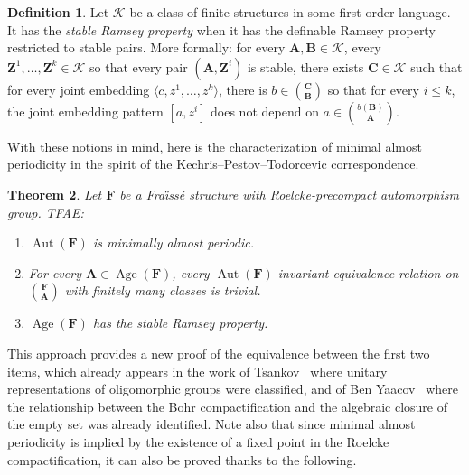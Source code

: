 \documentclass[11pt]{article}
\newtheorem{theo}{Theorem}[section]
\theoremstyle{definition}
\newtheorem{defi}[theo]{Definition}
\numberwithin{equation}{section}
\numberwithin{figure}{section}
\numberwithin{table}{section}
\newcommand{\K}{\mathcal{K}}
\newcommand*{\mA}{\mathbf{A}}
\newcommand*{\mB}{\mathbf{B}}
\newcommand*{\mC}{\mathbf{C}}
\newcommand*{\mF}{\mathbf{F}}
\newcommand*{\mZ}{\mathbf{Z}}
\DeclareMathOperator{\Aut}{Aut}
\DeclareMathOperator{\Age}{Age}
\begin{document}
\begin{defi}
Let $\K$ be a class of finite structures in some first-order language. It has the \emph{stable Ramsey property} when it has the definable Ramsey property restricted to stable pairs. More formally: for every $\mA, \mB\in \K$, every $\mZ^{1},\ldots,\mZ^{k}\in \K$ so that every pair $(\mA, \mZ^{i})$ is stable, there exists $\mC \in \K$ such that for every joint embedding $\langle c,z^{1},\ldots,z^{k}\rangle$, there is $b\in \binom{\mC}{\mB}$ so that for every $i\leq k$, the joint embedding pattern $[a,z^{i}]$ does not depend on $a\in \binom{b(\mB)}{\mA}$.
\end{defi}

With these notions in mind, here is the characterization of minimal almost periodicity in the spirit of the Kechris--Pestov--Todorcevic correspondence.

\begin{theo}\label{thm:MAPStableRP}
Let $\mF$ be a Fra\"{\i}ss\'e structure with Roelcke-precompact automorphism group. TFAE:
\begin{enumerate}
\item \label{1.6.1} $\Aut(\mF)$ is minimally almost periodic.
\item \label{1.6.2} For every $\mA\in \Age(\mF)$, every $\Aut(\mF)$-invariant equivalence relation on $\binom{\mF}{\mA}$ with finitely many classes is trivial.
\item \label{1.6.3} $\Age(\mF)$ has the stable Ramsey property.
\end{enumerate}
\end{theo}

This approach provides a new proof of the equivalence between the first two items, which already appears in the work of Tsankov~\cite{Ts} where unitary representations of oligomorphic groups were classified, and of Ben Yaacov~\cite{BY} where the relationship between the Bohr compactification and the algebraic closure of the empty set was already identified. Note also that since minimal almost periodicity is implied by the existence of a fixed point in the Roelcke compactification, it can also be proved thanks to the following.
\end{document}

